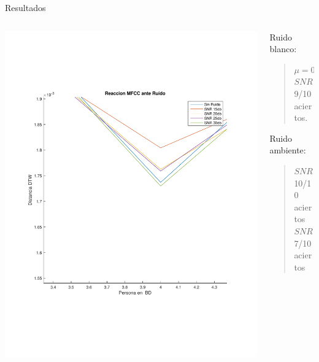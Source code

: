 \documentclass{beamer}
\begin{document}
\begin{frame}{Resultados}

\begin{columns}
\begin{column}{0.6\linewidth}
\includegraphics[width=\linewidth]{mfccRuido}
\end{column}

\begin{column}{0.4\linewidth}
Ruido blanco:
 
\begin{quote}
$\mu=0,\sigma=0.5$\\ $SNR = 45[dB]$ \\ 9/10 aciertos.
\end{quote}

Ruido ambiente:

\begin{quote}
$SNR=30[dB]$ \\ 10/10 aciertos \\
$SNR=25[dB]$ \\ 7/10 aciertos
\end{quote}
\end{column}
\end{columns}

\end{frame}
\end{document}
